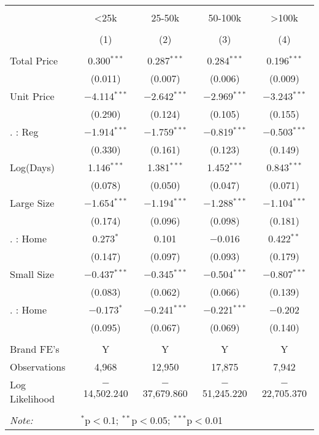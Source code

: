 
\begin{table}[!htbp] \centering 
  \caption{} 
  \label{} 
\begin{tabular}{@{\extracolsep{5pt}}lcccc} 
\\[-1.8ex]\hline 
\hline \\[-1.8ex] 
 & <25k & 25-50k & 50-100k & >100k \\ 
\\[-1.8ex] & (1) & (2) & (3) & (4)\\ 
\hline \\[-1.8ex] 
 Total Price & 0.300$^{***}$ & 0.287$^{***}$ & 0.284$^{***}$ & 0.196$^{***}$ \\ 
  & (0.011) & (0.007) & (0.006) & (0.009) \\ 
  Unit Price & $-$4.114$^{***}$ & $-$2.642$^{***}$ & $-$2.969$^{***}$ & $-$3.243$^{***}$ \\ 
  & (0.290) & (0.124) & (0.105) & (0.155) \\ 
  . : Reg & $-$1.914$^{***}$ & $-$1.759$^{***}$ & $-$0.819$^{***}$ & $-$0.503$^{***}$ \\ 
  & (0.330) & (0.161) & (0.123) & (0.149) \\ 
  Log(Days) & 1.146$^{***}$ & 1.381$^{***}$ & 1.452$^{***}$ & 0.843$^{***}$ \\ 
  & (0.078) & (0.050) & (0.047) & (0.071) \\ 
  Large Size & $-$1.654$^{***}$ & $-$1.194$^{***}$ & $-$1.288$^{***}$ & $-$1.104$^{***}$ \\ 
  & (0.174) & (0.096) & (0.098) & (0.181) \\ 
  . : Home & 0.273$^{*}$ & 0.101 & $-$0.016 & 0.422$^{**}$ \\ 
  & (0.147) & (0.097) & (0.093) & (0.179) \\ 
  Small Size & $-$0.437$^{***}$ & $-$0.345$^{***}$ & $-$0.504$^{***}$ & $-$0.807$^{***}$ \\ 
  & (0.083) & (0.062) & (0.066) & (0.139) \\ 
  . : Home & $-$0.173$^{*}$ & $-$0.241$^{***}$ & $-$0.221$^{***}$ & $-$0.202 \\ 
  & (0.095) & (0.067) & (0.069) & (0.140) \\ 
 \hline \\[-1.8ex] 
Brand FE's & Y & Y & Y & Y \\ 
Observations & 4,968 & 12,950 & 17,875 & 7,942 \\ 
Log Likelihood & $-$14,502.240 & $-$37,679.860 & $-$51,245.220 & $-$22,705.370 \\ 
\hline 
\hline \\[-1.8ex] 
\textit{Note:}  & \multicolumn{4}{l}{$^{*}$p$<$0.1; $^{**}$p$<$0.05; $^{***}$p$<$0.01} \\ 
\end{tabular} 
\end{table} 
